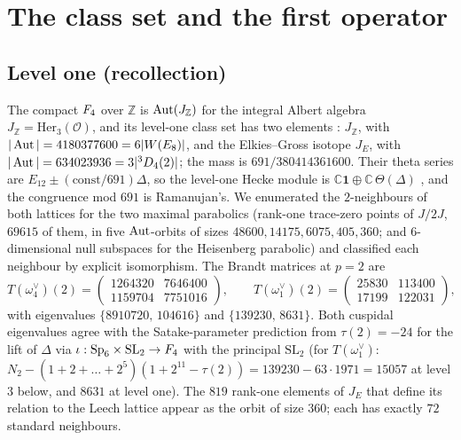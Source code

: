 \documentclass[11pt]{amsart}
\theoremstyle{definition}
\newcommand{\Z}{\mathbb{Z}}\newcommand{\Q}{\mathbb{Q}}\newcommand{\R}{\mathbb{R}}\newcommand{\A}{\mathbb{A}}\newcommand{\F}{\mathbb{F}}
\begin{document}
\section{The class set and the first operator}\label{sec:setting}
\subsection{Level one (recollection)} The compact $F_4$ over $\Z$ is $\Aut(J_\Z)$ for the integral Albert algebra $J_\Z=\mathrm{Her}_3(\mathcal O)$, and its level-one class set has two elements \cite{Gross-Z,EG}: $J_\Z$, with $|\operatorname{Aut}|=4180377600=6|W(E_8)|$, and the Elkies--Gross isotope $J_E$, with $|\operatorname{Aut}|=634023936=3|{}^3D_4(2)|$; the mass is $691/380414361600$. Their theta series are $E_{12}\pm(\text{const}/691)\Delta$, so the level-one Hecke module is $\mathbb{C}\mathbf 1\oplus\mathbb{C}\,\Theta(\Delta)$ \cite{Shan}, and the congruence mod $691$ is Ramanujan's. We enumerated the $2$-neighbours of both lattices for the two maximal parabolics (rank-one trace-zero points of $J/2J$, $69615$ of them, in five $\operatorname{Aut}$-orbits of sizes $48600,14175,6075,405,360$; and $6$-dimensional null subspaces for the Heisenberg parabolic) and classified each neighbour by explicit isomorphism. The Brandt matrices at $p=2$ are
\[T(\omega_4^\vee)(2)=\begin{pmatrix}1264320&7646400\\1159704&7751016\end{pmatrix},\qquad T(\omega_1^\vee)(2)=\begin{pmatrix}25830&113400\\17199&122031\end{pmatrix},\]
with eigenvalues $\{8910720,\,104616\}$ and $\{139230,\,8631\}$. Both cuspidal eigenvalues agree with the Satake-parameter prediction from $\tau(2)=-24$ for the lift of $\Delta$ via $\iota:\mathrm{Sp}_6\times\mathrm{SL}_2\to F_4$ with the principal $\mathrm{SL}_2$ (for $T(\omega_1^\vee)$: $N_2-(1+2+\dots+2^5)(1+2^{11}-\tau(2))=139230-63\cdot1971=15057$ at level $3$ below, and $8631$ at level one). The $819$ rank-one elements of $J_E$ that define its relation to the Leech lattice \cite{EG} appear as the orbit of size $360$; each has exactly $72$ standard neighbours.
\end{document}
